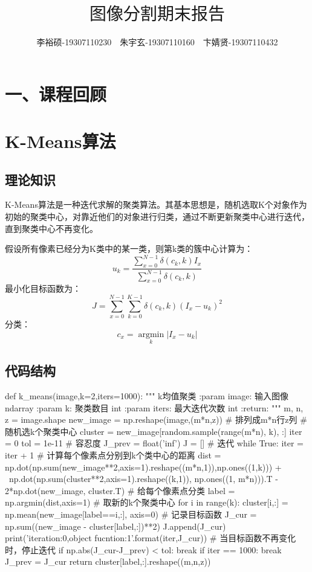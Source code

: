 \documentclass{article}
\title{\vspace{-3.1cm}$\textbf{图像分割期末报告}$}
\author{李裕硕-19307110230$\quad$朱宇玄-19307110160$\quad$卞婧贤-19307110432}
\date{}
\begin{document}
\maketitle
{}

\section*{\textbf{一、课程回顾}}
\section{K-Means算法}
\subsection{理论知识}
K-Means算法是一种迭代求解的聚类算法。其基本思想是，随机选取K个对象作为初始的聚类中心，对靠近他们的对象进行归类，通过不断更新聚类中心进行迭代，直到聚类中心不再变化。

假设所有像素已经分为K类中的某一类，则第k类的簇中心计算为：
$$u_{k}=\frac{\sum_{x=0}^{N-1}\delta(c_k,k)I_x}{\sum_{x=0}^{N-1}\delta(c_k,k)}$$
最小化目标函数为：
$$ J=\sum_{x=0}^{N-1} \sum_{k=0}^{K-1}\delta(c_k,k)(I_x - u_k)^2$$
分类：
$$c_x = \mathop{\arg\min}\limits_{k}|I_x - u_k|
$$
\subsection{代码结构}
\begin{python}
	def k_means(image,k=2,iters=1000):
    """
    k均值聚类
    :param image: 输入图像 ndarray
    :param k: 聚类数目 int
    :param iters: 最大迭代次数 int
    :return:
    """
    m, n, z = image.shape
    new_image = np.reshape(image,(m*n,z))  # 排列成m*n行z列
    # 随机选k个聚类中心
    cluster = new_image[random.sample(range(m*n), k), :]
    iter = 0
    tol = 1e-11  # 容忍度
    J_prev = float('inf')
    J = []
    # 迭代
    while True:
        iter = iter + 1
        # 计算每个像素点分别到k个类中心的距离
        dist = np.dot(np.sum(new_image**2,axis=1).reshape((m*n,1)),np.ones((1,k))) + \
            np.dot(np.sum(cluster**2,axis=1).reshape((k,1)), np.ones((1, m*n))).T - 2*np.dot(new_image, cluster.T)
        # 给每个像素点分类
        label = np.argmin(dist,axis=1)
        # 取新的k个聚类中心
        for i in range(k):
            cluster[i,:] = np.mean(new_image[label==i,:], axis=0)
        # 记录目标函数
        J_cur = np.sum((new_image - cluster[label,:])**2)
        J.append(J_cur)
        print('iteration:{0},object fucntion:{1}'.format(iter,J_cur))
        # 当目标函数不再变化时，停止迭代
        if np.abs(J_cur-J_prev) < tol:
            break
        if iter == 1000:
            break
        J_prev = J_cur
    return cluster[label,:].reshape((m,n,z))
\end{python}
\end{document}
